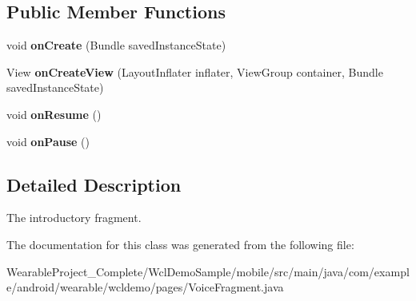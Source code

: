 \subsection*{Public Member Functions}
\begin{DoxyCompactItemize}
\item 
void {\bfseries on\+Create} (Bundle saved\+Instance\+State)\hypertarget{classcom_1_1example_1_1android_1_1wearable_1_1wcldemo_1_1pages_1_1VoiceFragment_af5eccd33ee50573e6ddda989c6e5d4e0}{}\label{classcom_1_1example_1_1android_1_1wearable_1_1wcldemo_1_1pages_1_1VoiceFragment_af5eccd33ee50573e6ddda989c6e5d4e0}

\item 
View {\bfseries on\+Create\+View} (Layout\+Inflater inflater, View\+Group container, Bundle saved\+Instance\+State)\hypertarget{classcom_1_1example_1_1android_1_1wearable_1_1wcldemo_1_1pages_1_1VoiceFragment_a42cd2838be7606ae6ce61040f7739b37}{}\label{classcom_1_1example_1_1android_1_1wearable_1_1wcldemo_1_1pages_1_1VoiceFragment_a42cd2838be7606ae6ce61040f7739b37}

\item 
void {\bfseries on\+Resume} ()\hypertarget{classcom_1_1example_1_1android_1_1wearable_1_1wcldemo_1_1pages_1_1VoiceFragment_ae135905aed1221057a0dbb0432ab1b39}{}\label{classcom_1_1example_1_1android_1_1wearable_1_1wcldemo_1_1pages_1_1VoiceFragment_ae135905aed1221057a0dbb0432ab1b39}

\item 
void {\bfseries on\+Pause} ()\hypertarget{classcom_1_1example_1_1android_1_1wearable_1_1wcldemo_1_1pages_1_1VoiceFragment_a703205baccf5824f6b34f357dc6ab930}{}\label{classcom_1_1example_1_1android_1_1wearable_1_1wcldemo_1_1pages_1_1VoiceFragment_a703205baccf5824f6b34f357dc6ab930}

\end{DoxyCompactItemize}


\subsection{Detailed Description}
The introductory fragment. 

The documentation for this class was generated from the following file\+:\begin{DoxyCompactItemize}
\item 
Wearable\+Project\+\_\+\+Complete/\+Wcl\+Demo\+Sample/mobile/src/main/java/com/example/android/wearable/wcldemo/pages/Voice\+Fragment.\+java\end{DoxyCompactItemize}
